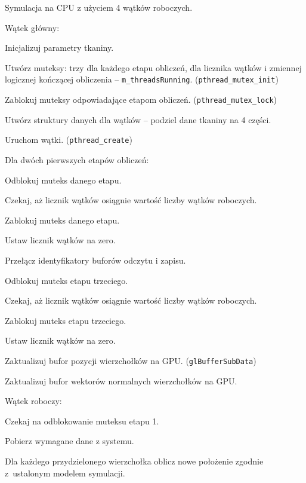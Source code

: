 		\begin{algorithm}[H]
			\label{alg_5_3}
			\caption{Symulacja na CPU z użyciem 4 wątków roboczych.}	
			Wątek główny:
			
			\Indp
			
			Inicjalizuj parametry tkaniny.
			
			Utwórz muteksy: trzy dla każdego etapu obliczeń, dla licznika wątków i zmiennej logicznej kończącej obliczenia -- \texttt{m\_threadsRunning}. (\texttt{pthread\_mutex\_init})
			
			Zablokuj muteksy odpowiadające etapom obliczeń. (\texttt{pthread\_mutex\_lock})
			
			Utwórz struktury danych dla wątków -- podziel dane tkaniny na 4 części.
			
			Uruchom wątki. (\texttt{pthread\_create})
			
			{
				Dla dwóch pierwszych etapów obliczeń:
				
				\Indp
					Odblokuj muteks danego etapu.
					
					Czekaj, aż licznik wątków osiągnie wartość liczby wątków roboczych.
					
					Zablokuj muteks danego etapu.
					
					Ustaw licznik wątków na zero.
					
					Przełącz identyfikatory buforów odczytu i zapisu.
				\Indm
				
				Odblokuj muteks etapu trzeciego.
				
				Czekaj, aż licznik wątków osiągnie wartość liczby wątków roboczych.
				
				Zablokuj muteks etapu trzeciego.
				
				Ustaw licznik wątków na zero.
				
				Zaktualizuj bufor pozycji wierzchołków na GPU. (\texttt{glBufferSubData})
				
				Zaktualizuj bufor wektorów normalnych wierzchołków na GPU.
			}
			
			\Indm
			
			Wątek roboczy:
			
			\Indp
			
			{
				Czekaj na odblokowanie muteksu etapu 1.
				
				Pobierz wymagane dane z systemu.
				
				Dla każdego przydzielonego wierzchołka oblicz nowe położenie zgodnie z~ustalonym modelem symulacji.
				
}
\end{algorithm}
